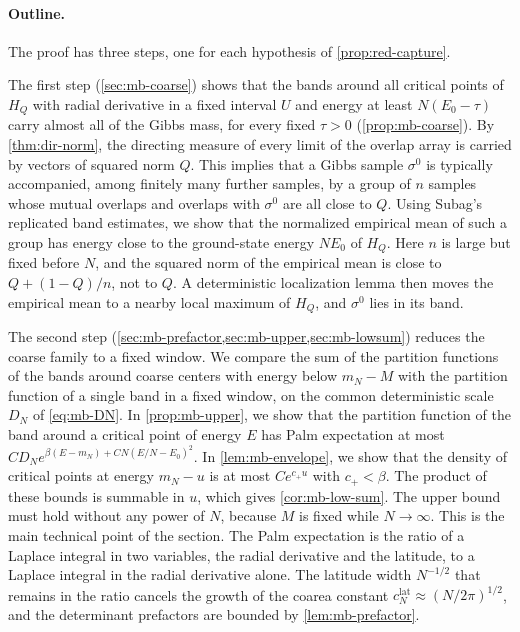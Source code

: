 \paragraph{Outline.}
The proof has three steps, one for each hypothesis of \cref{prop:red-capture}.

The first step (\cref{sec:mb-coarse}) shows that the bands around all critical points of $H_Q$ with radial derivative in a fixed interval $U$ and energy at least $N(E_0-\tau)$ carry almost all of the Gibbs mass, for every fixed $\tau>0$ (\cref{prop:mb-coarse}). By \cref{thm:dir-norm}, the directing measure of every limit of the overlap array is carried by vectors of squared norm $Q$. This implies that a Gibbs sample $\sigma^0$ is typically accompanied, among finitely many further samples, by a group of $n$ samples whose mutual overlaps and overlaps with $\sigma^0$ are all close to $Q$. Using Subag's replicated band estimates, we show that the normalized empirical mean of such a group has energy close to the ground-state energy $NE_0$ of $H_Q$. Here $n$ is large but fixed before $N$, and the squared norm of the empirical mean is close to $Q+(1-Q)/n$, not to $Q$. A deterministic localization lemma then moves the empirical mean to a nearby local maximum of $H_Q$, and $\sigma^0$ lies in its band.

The second step (\cref{sec:mb-prefactor,sec:mb-upper,sec:mb-lowsum}) reduces the coarse family to a fixed window. We compare the sum of the partition functions of the bands around coarse centers with energy below $m_N-M$ with the partition function of a single band in a fixed window, on the common deterministic scale $D_N$ of \eqref{eq:mb-DN}. In \cref{prop:mb-upper}, we show that the partition function of the band around a critical point of energy $E$ has Palm expectation at most $CD_Ne^{\beta(E-m_N)+CN(E/N-E_0)^2}$. In \cref{lem:mb-envelope}, we show that the density of critical points at energy $m_N-u$ is at most $Ce^{c_+u}$ with $c_+<\beta$. The product of these bounds is summable in $u$, which gives \cref{cor:mb-low-sum}. The upper bound must hold without any power of $N$, because $M$ is fixed while $N\to\infty$. This is the main technical point of the section. The Palm expectation is the ratio of a Laplace integral in two variables, the radial derivative and the latitude, to a Laplace integral in the radial derivative alone. The latitude width $N^{-1/2}$ that remains in the ratio cancels the growth of the coarea constant $c_N^{\mathrm{lat}}\approx(N/2\pi)^{1/2}$, and the determinant prefactors are bounded by \cref{lem:mb-prefactor}.

